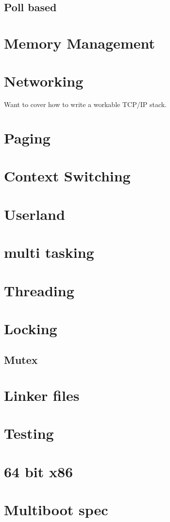 \documentclass[oneside,english,final]{amsbook}
\begin{document}
\section{Poll based}

\chapter{Memory Management}
\chapter{Networking}
Want to cover how to write a workable TCP/IP stack.
\chapter{Paging}
\chapter{Context Switching}
\chapter{Userland}
\chapter{multi tasking}
\chapter{Threading}
\chapter{Locking}
\section{Mutex}
\chapter{Linker files}
\chapter{Testing}
\chapter{64 bit x86}
\chapter{Multiboot spec}
\end{document}
